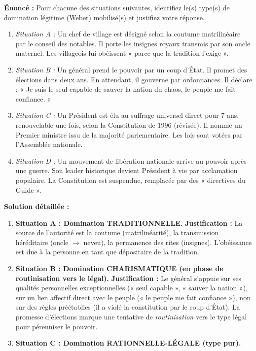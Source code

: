 \documentclass[11pt]{article}
\begin{document}
\begin{exoresolu}
\textbf{Énoncé :} Pour chacune des situations suivantes, identifiez le(s) type(s) de domination légitime (Weber) mobilisé(s) et justifiez votre réponse.
\begin{enumerate}
    \item \textit{Situation A :} Un chef de village est désigné selon la coutume matrilinéaire par le conseil des notables. Il porte les insignes royaux transmis par son oncle maternel. Les villageois lui obéissent « parce que la tradition l'exige ».
    \item \textit{Situation B :} Un général prend le pouvoir par un coup d'État. Il promet des élections dans deux ans. En attendant, il gouverne par ordonnances. Il déclare : « Je suis le seul capable de sauver la nation du chaos, le peuple me fait confiance. »
    \item \textit{Situation C :} Un Président est élu au suffrage universel direct pour 7 ans, renouvelable une fois, selon la Constitution de 1996 (révisée). Il nomme un Premier ministre issu de la majorité parlementaire. Les lois sont votées par l'Assemblée nationale.
    \item \textit{Situation D :} Un mouvement de libération nationale arrive au pouvoir après une guerre. Son leader historique devient Président à vie par acclamation populaire. La Constitution est suspendue, remplacée par des « directives du Guide ».
\end{enumerate}
\tcblower
\textbf{Solution détaillée :}
\begin{enumerate}
    \item \textbf{Situation A : Domination TRADITIONNELLE.}
    \textbf{Justification :} La source de l'autorité est la coutume (matrilinéarité), la transmission héréditaire (oncle $\rightarrow$ neveu), la permanence des rites (insignes). L'obéissance est due à la personne en tant que dépositaire de la tradition.
    \item \textbf{Situation B : Domination CHARISMATIQUE (en phase de routinisation vers le légal).}
    \textbf{Justification :} Le général s'appuie sur ses qualités personnelles exceptionnelles (« seul capable », « sauver la nation »), sur un lien affectif direct avec le peuple (« le peuple me fait confiance »), non sur des règles préétablies (il a violé la constitution par le coup d'État). La promesse d'élections marque une tentative de \emph{routinisation} vers le type légal pour pérenniser le pouvoir.
    \item \textbf{Situation C : Domination RATIONNELLE-LÉGALE (type pur).}

\end{enumerate}
\end{exoresolu}
\end{document}
